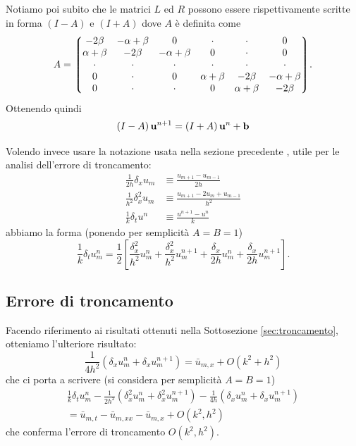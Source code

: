 \documentclass[10pt,a4paper]{article}
\begin{document}
Notiamo poi subito che le matrici $L$ ed $R$ possono essere rispettivamente scritte in forma $(I-A)$ e $(I+A)$ dove $A$ è definita come
\begin{equation}
	A = \mqty*(-2\beta & -\alpha + \beta & 0 & \cdot & \cdot & 0 \\ \alpha +\beta & -2\beta & -\alpha+\beta & 0 & \cdot & 0 \\ \cdot & \cdot & \cdot & \cdot & \cdot & \cdot \\ 0 & \cdot & 0 & \alpha +\beta & -2\beta & -\alpha+\beta \\ 0 & \cdot & \cdot & 0 & \alpha+\beta & -2\beta). 
\end{equation}
Ottenendo quindi
\begin{equation}
	\left(I-A\right)\vb{u}^{n+1} = \left(I+A\right)\vb{u}^n + \vb{b}
\end{equation}

Volendo invece usare la notazione usata nella sezione precedente , utile per le analisi dell'errore di troncamento:
\begin{align}
	\frac{1}{2h}\delta_x u_m &\equiv \frac{u_{m+1}-u_{m-1}}{2h}\\
	\frac{1}{h^2}\delta_x^2 u_m &\equiv \frac{u_{m+1}-2u_m+u_{m-1}}{h^2}\\
	\frac{1}{k}\delta_t u^n &\equiv \frac{u^{n+1}-u^n}{k}
\end{align}
abbiamo la forma (ponendo per semplicità $A=B=1$)
\begin{equation}
	\frac{1}{k}\delta_t u_m^n = \frac{1}{2}\left[\frac{\delta_x^2}{h^2}u_m^n + \frac{\delta_x^2}{h^2}u_m^{n+1} + \frac{\delta_x}{2h}u_m^n + \frac{\delta_x}{2h}u_m^{n+1} \right].
\end{equation}

\subsection{Errore di troncamento}

Facendo riferimento ai risultati ottenuti nella Sottosezione \ref{sec:troncamento}, otteniamo l'ulteriore risultato:
\begin{equation}
	\frac{1}{4h^2}(\delta_x u_m^n + \delta_x u_m^{n+1}) = \bar{u}_{m,x} + O(k^2 + h^2)
\end{equation}
che ci porta a scrivere (si considera per semplicità $A=B=1$)
\begin{multline}
 	\frac{1}{k} \delta_t u_m^n - \frac{1}{2h^2}(\delta_x^2 u_m^n + \delta_x^2 u_m^{n+1}) - \frac{1}{4h}(\delta_x u_m^n + \delta_x u_m^{n+1}) \\= \bar{u}_{m,t} - \bar{u}_{m,xx} -\bar{u}_{m,x} + O(k^2, h^2)
\end{multline} 
che conferma l'errore di troncamento $O(k^2, h^2)$.
\end{document}
